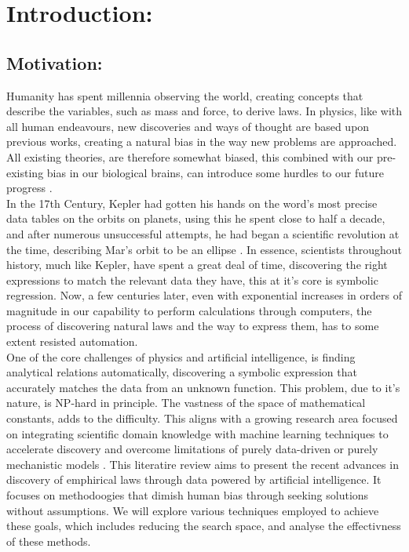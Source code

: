 \documentclass{article}
\begin{document}
\newpage

\tableofcontents 

\newpage
{}



\section{Introduction: }

\subsection{Motivation: }

Humanity has spent millennia observing the world, creating concepts that describe the variables, such as mass and force, to derive laws. In physics, like with
all human endeavours, new discoveries and ways of thought are based upon previous works, creating
a natural bias in the way new problems are approached. All existing theories, are therefore
somewhat biased, this combined with our pre-existing bias in our biological brains, can introduce some
hurdles to our future progress \cite{Wood2022} \cite{Schmidt2009}.\\

In the 17th Century, Kepler had gotten his hands on the word’s most precise data tables on the orbits
on planets, using this he spent close to half a decade, and after numerous unsuccessful
attempts, he had began a scientific revolution at the time, describing Mar’s orbit to be an ellipse \cite{kepler}.
In essence, scientists throughout history, much like Kepler, have spent a great deal of time, discovering
the right expressions to match the relevant data they have, this at it’s core is symbolic regression. Now,
a few centuries later, even with exponential increases in orders of magnitude in our capability to perform
calculations through computers, the process of discovering natural laws and the way to express them,
has to some extent resisted automation.\\


One of the core challenges of physics and artificial intelligence, is finding analytical relations automatically, discovering a symbolic expression that accurately matches the data from an unknown function.
This problem, due to it’s nature, is NP-hard \cite{Hope2023} in principle. The vastness of the space
of mathematical constants, adds to the difficulty. This aligns with a growing research area focused on integrating scientific domain knowledge with machine learning techniques to accelerate discovery and overcome limitations of purely data-driven or purely mechanistic models \cite{willard2022}.
This literatire review aims to present the recent advances in discovery of emphirical laws through data powered by artificial intelligence. It focuses on methodoogies that dimish human bias through seeking solutions without assumptions. We will explore various techniques employed to achieve these goals, which includes reducing the search space, and analyse the effectivness of these methods.\\  
\end{document}
